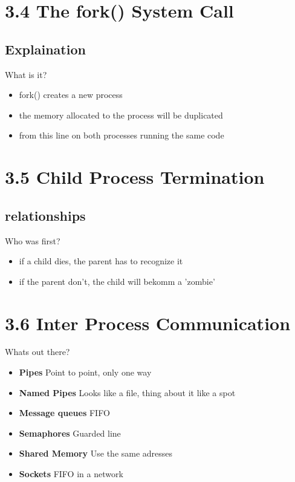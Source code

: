 \documentclass[hyperref={pdfpagelabels=false}]{beamer}
\begin{document}
\section{3.4 The fork() System Call}
    \subsection{Explaination}
    \begin{frame}{What is it?}
        \begin{itemize}
            \item<1-> fork() creates a new process
            \item<2-> the memory allocated to the process will be duplicated
            \item<3-> from this line on both processes running the same code
        \end{itemize}
    \end{frame}
\section{3.5 Child Process Termination}
    \subsection{relationships}
    \begin{frame}{Who was first?}
        \begin{itemize}
            \item<1-> if a child dies, the parent has to recognize it
            \item<2-> if the parent don't, the child will bekomm a 'zombie'
        \end{itemize}
    \end{frame}
\section{3.6 Inter Process Communication}
    \begin{frame}{Whats out there?}
        \begin{itemize}
            \item<1-> \textbf{Pipes} Point to point, only one way
            \item<2-> \textbf{Named Pipes} Looks like a file, thing about it like a spot
            \item<3-> \textbf{Message queues} FIFO
            \item<4-> \textbf{Semaphores} Guarded line
            \item<5-> \textbf{Shared Memory} Use the same adresses
            \item<6-> \textbf{Sockets} FIFO in a network
        \end{itemize}
    \end{frame}
\end{document}
